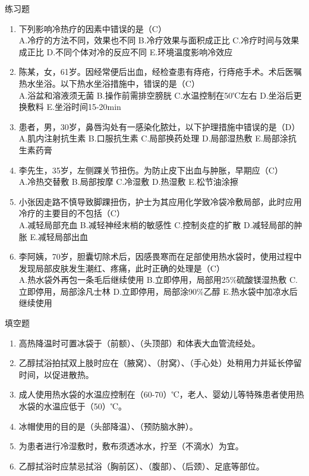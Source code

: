 \documentclass[11pt, a4paper]{ctexart}
\begin{document}
\begin{examplebox}{练习题}
\begin{enumerate}
    \item 下列影响冷热疗的因素中错误的是（C）\\
    A.冷疗的方法不同，效果也不同 \quad B.冷疗效果与面积成正比 \quad C.冷疗时间与效果成正比 \quad D.不同个体对冷的反应不同 \quad E.环境温度影响冷效应
    \item 陈某，女，61岁。因经常便后出血，经检查患有痔疮，行痔疮手术。术后医嘱热水坐浴。以下热水坐浴措施中，错误的是（C）\\
    A.浴盆和溶液须无菌 \quad B.操作前需排空膀胱 \quad C.水温控制在50℃左右 \quad D.坐浴后更换敷料 \quad E.坐浴时间15-20min
    \item 患者，男，30岁，鼻唇沟处有一感染化脓灶，以下护理措施中错误的是（D）\\
    A.肌内注射抗生素 \quad B.口服抗生素 \quad C.局部换药处理 \quad D.局部湿热敷 \quad E.局部涂抗生素药膏
    \item 李先生，35岁，左侧踝关节扭伤。为防止皮下出血与肿胀，早期应（C）\\
    A.冷热交替敷 \quad B.局部按摩 \quad C.冷湿敷 \quad D.热湿敷 \quad E.松节油涂擦
    \item 小张因走路不慎导致脚踝扭伤，护士为其应用化学致冷袋冷敷局部，此时应用冷疗的主要目的不包括（C）\\
    A.减轻局部充血 \quad B.减轻神经末梢的敏感性 \quad C.控制炎症的扩散 \quad D.减轻局部的肿胀 \quad E.减轻局部出血
    \item 李阿姨，70岁，胆囊切除术后，因感畏寒而在足部使用热水袋时，使用过程中发现局部皮肤发生潮红、疼痛，此时正确的处理是（C）\\
    A.热水袋外再包一条毛后继续使用 \quad B.立即停用，局部用25\%硫酸镁湿热敷 \quad C.立即停用，局部涂凡士林 \quad D.立即停用，局部涂90\%乙醇 \quad E.热水袋中加凉水后继续使用
\end{enumerate}
\end{examplebox}

\begin{tipsbox}{填空题}
\begin{enumerate}
    \item 高热降温时可置冰袋于（前额）、（头顶部）和体表大血管流经处。
    \item 乙醇拭浴拍拭双上肢时应在（腋窝）、（肘窝）、（手心处）处稍用力并延长停留时间，以促进散热。
    \item 成人使用热水袋的水温应控制在（60-70）℃，老人、婴幼儿等特殊患者使用热水袋的水温应低于（50）℃。
    \item 冰帽使用的目的是（头部降温）、（预防脑水肿）。
    \item 为患者进行冷湿敷时，敷布须透冰水，拧至（不滴水）为宜。
    \item 乙醇拭浴时应禁忌拭浴（胸前区）、（腹部）、（后颈）、足底等部位。
\end{enumerate}
\end{tipsbox}
\end{document}
